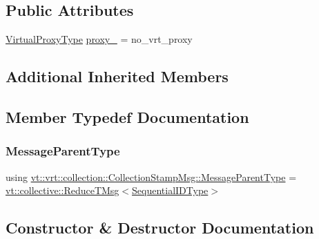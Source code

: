 \subsection*{Public Attributes}
\begin{DoxyCompactItemize}
\item 
\hyperlink{namespacevt_a1b417dd5d684f045bb58a0ede70045ac}{Virtual\+Proxy\+Type} \hyperlink{structvt_1_1vrt_1_1collection_1_1_collection_stamp_msg_a14b201da61295140c6947db17718105a}{proxy\+\_\+} = no\+\_\+vrt\+\_\+proxy
\end{DoxyCompactItemize}
\subsection*{Additional Inherited Members}


\subsection{Member Typedef Documentation}
\mbox{\label{structvt_1_1vrt_1_1collection_1_1_collection_stamp_msg_ac804b80a7abb715cc14b087e8714352a}} 
\subsubsection{\texorpdfstring{Message\+Parent\+Type}{MessageParentType}}
{\footnotesize\ttfamily using \hyperlink{structvt_1_1vrt_1_1collection_1_1_collection_stamp_msg_ac804b80a7abb715cc14b087e8714352a}{vt\+::vrt\+::collection\+::\+Collection\+Stamp\+Msg\+::\+Message\+Parent\+Type} =  \hyperlink{namespacevt_1_1collective_a28b82d5d48c9bc6e4fd738fcbf9e0f62}{vt\+::collective\+::\+Reduce\+T\+Msg}$<$\hyperlink{namespacevt_a3063d4db3b879d6dd2c7b8d50995c7f6}{Sequential\+I\+D\+Type}$>$}



\subsection{Constructor \& Destructor Documentation}
\mbox{\label{structvt_1_1vrt_1_1collection_1_1_collection_stamp_msg_ae285a89b90d6975acfcb20e51c6ad3d0}} 
